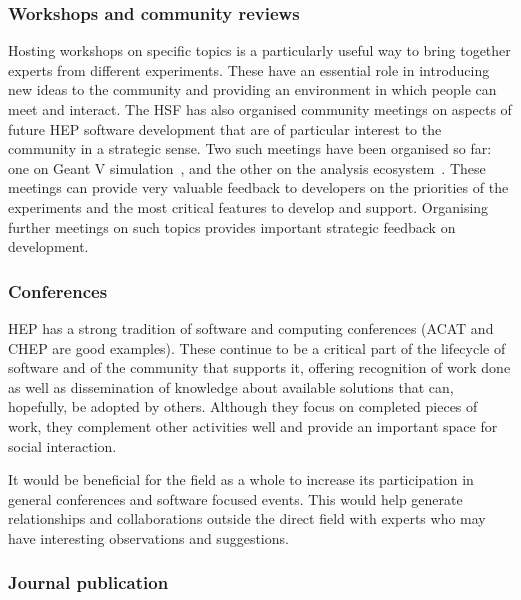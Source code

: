 \documentclass[12pt,a4paper]{article}
\begin{document}
\hypertarget{workshops-and-community-reviews}{%
\subsubsection{Workshops and community
reviews}\label{workshops-and-community-reviews}}

Hosting workshops on specific topics is a particularly useful way to
bring together experts from different experiments. These have an
essential role in introducing new ideas to the community and providing
an environment in which people can meet and interact. The HSF has also
organised community meetings on aspects of future HEP software
development that are of particular interest to the community in a
strategic sense. Two such meetings have been organised so far: one on
Geant V simulation~\cite{HSF-GeantV-Report}, and the other on the analysis
ecosystem~\cite{HSF-Analysis-Report}. These meetings can provide very valuable
feedback to developers on the priorities of the experiments and the most
critical features to develop and support. Organising further meetings on such topics provides
important strategic feedback on development.

\hypertarget{conferences}{%
\subsubsection{Conferences}\label{conferences}}

HEP has a strong tradition of software and computing conferences (ACAT
and CHEP are good examples). These continue to be a critical part of the
lifecycle of software and of the community that supports it, offering
recognition of work done as well as dissemination of knowledge about
available solutions that can, hopefully, be adopted by others. Although
they focus on completed pieces of work, they complement other activities
well and provide an important space for social interaction.

It would be beneficial for the field as a whole to increase its
participation in general conferences and software focused events. This
would help generate relationships and collaborations outside the direct
field with experts who may have interesting observations and
suggestions.

\hypertarget{journal-publication}{%
\subsubsection{Journal publication}\label{journal-publication}}
\end{document}
